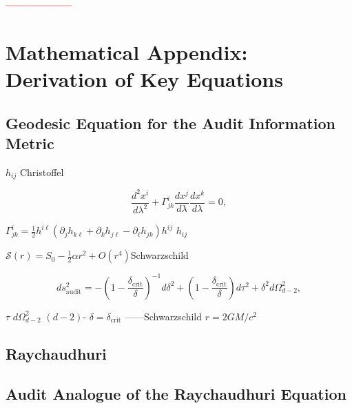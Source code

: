 \documentclass[12pt,a4paper]{article}
\theoremstyle{remark}
\newcommand{\honestcrit}[1]{%
    \textcolor{red}{\textbf{#1}}%
}
\begin{document}
\honestcrit{——————}

\section{}
\section{Mathematical Appendix: Derivation of Key Equations}

\subsection{}
\subsection{Geodesic Equation for the Audit Information Metric}

 $h_{ij}$ Christoffel

\begin{equation}
    \frac{d^2 x^i}{d\lambda^2} + \Gamma^{i}_{jk} \frac{dx^j}{d\lambda} \frac{dx^k}{d\lambda} = 0,
\end{equation}

 $\Gamma^{i}_{jk} = \frac{1}{2} h^{i\ell}(\partial_j h_{k\ell} + \partial_k h_{j\ell} - \partial_\ell h_{jk})$$h^{ij}$  $h_{ij}$ 

$\mathcal{S}(r) = S_0 - \frac{1}{2}\alpha r^2 + O(r^4)$Schwarzschild

\begin{equation}
    ds^2_{\mathrm{audit}} = -\left(1 - \frac{\delta_{\mathrm{crit}}}{\delta}\right)^{-1} d\delta^2 + \left(1 - \frac{\delta_{\mathrm{crit}}}{\delta}\right) d\tau^2 + \delta^2 d\Omega^2_{d-2},
\end{equation}

 $\tau$ $d\Omega^2_{d-2}$  $(d-2)$- $\delta = \delta_{\mathrm{crit}}$ ——Schwarzschild $r=2GM/c^2$ 

\subsection{Raychaudhuri}
\subsection{Audit Analogue of the Raychaudhuri Equation}
\end{document}
